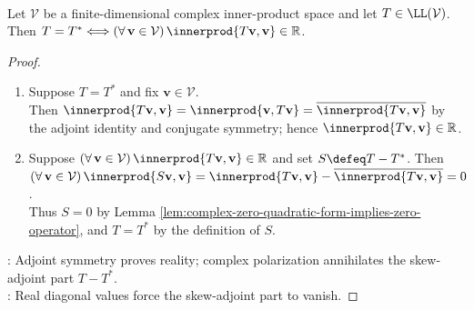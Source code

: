 \begin{proposition} \label{prop:complex-quadratic-form-self-adjoint-characterization} \\
Let $\mathcal{V}$ be a finite-dimensional complex inner-product space and let $T\in\LL(\mathcal{V})$. Then $T=T^*\Longleftrightarrow(\forall\,\mathbf{v}\in\mathcal{V})\,\innerprod{T\mathbf{v},\mathbf{v}}\in\mathbb{R}$.
\begin{proof}
\begin{enumerate}[label=\roman*.]
\setlength{\itemsep}{0pt}
\item[$(\Rightarrow)$] Suppose $T=T^*$ and fix $\mathbf{v}\in\mathcal{V}$.\\
Then $\innerprod{T\mathbf{v},\mathbf{v}}=\innerprod{\mathbf{v},T\mathbf{v}}=\overline{\innerprod{T\mathbf{v},\mathbf{v}}}$ by the adjoint identity and conjugate symmetry; hence $\innerprod{T\mathbf{v},\mathbf{v}}\in\mathbb{R}$.
\item[$(\Leftarrow)$] Suppose $(\forall\,\mathbf{v}\in\mathcal{V})\,\innerprod{T\mathbf{v},\mathbf{v}}\in\mathbb{R}$ and set $S\defeq T-T^*$. Then $(\forall\,\mathbf{v}\in\mathcal{V})\,\innerprod{S\mathbf{v},\mathbf{v}}=\innerprod{T\mathbf{v},\mathbf{v}}-\overline{\innerprod{T\mathbf{v},\mathbf{v}}}=0$.\\
Thus $S=0$ by Lemma \ref{lem:complex-zero-quadratic-form-implies-zero-operator}, and $T=T^*$ by the definition of $S$.
\end{enumerate}
: Adjoint symmetry proves reality; complex polarization annihilates the skew-adjoint part $T-T^*$.\\
: Real diagonal values force the skew-adjoint part to vanish.
\end{proof}
\end{proposition}

